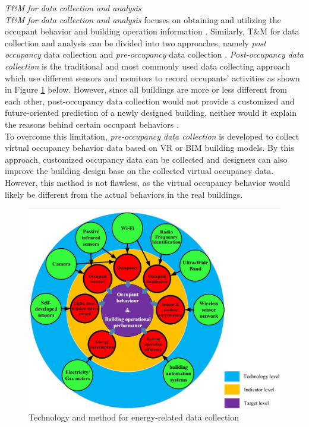 \documentclass[11pt, a4paper]{article}
\theoremstyle{definition}
\begin{document}
			\textit{T\&M for data collection and analysis}\\

			\textit{T\&M for data collection and analysis} focuses on obtaining and utilizing the occupant behavior and building operation information \cite{ZOU2018165}. Similarly, T\&M for data collection and analysis can be divided into two approaches, namely \textit{post occupancy} data collection and \textit{pre-occupancy} data collection \cite{ZOU2018165}. \textit{Post-occupancy data collection} is the traditional and most commonly used data collecting approach which use different sensors and monitors to record occupants' activities as shown in Figure \ref{fig:Energy_DataCollection} below. However, since all buildings are more or less different from each other, post-occupancy data collection would not provide a customized and future-oriented prediction of a newly designed building, neither would it explain the reasons behind certain occupant behaviors \cite{NIU2016275}.\\

			To overcome this limitation, \textit{pre-occupancy data collection} is developed to collect virtual occupancy behavior data based on VR or BIM building models. By this approach, customized occupancy data can be collected and designers can also improve the building design base on the collected virtual occupancy data. However, this method is not flawless, as the virtual occupancy behavior would likely be different from the actual behaviors in the real buildings.\\


			\begin{figure}[h!]
			\centering
			\includegraphics[scale=0.5]{Energy-relatedData.jpg}
			\caption{Technology and method for energy-related data collection \cite{jia2017occupancy}}
			\label{fig:Energy_DataCollection}
			\end{figure}
\end{document}
